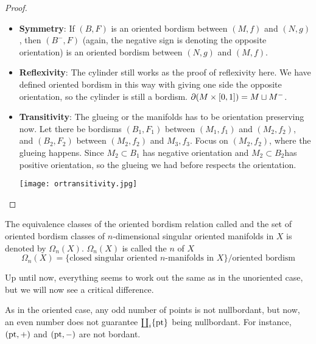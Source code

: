 \documentclass[a4paper,11pt]{article}
\begin{document}
\begin{proof}
    \begin{itemize}
        \item \textbf{Symmetry}: If \((B,F)\) is an oriented bordism between \((M,f)\) and \((N,g)\), then \((B^-,F)\) (again, the negative sign is denoting the opposite orientation) is an oriented bordism between \((N,g)\) and \((M,f)\).
        \item \textbf{Reflexivity}: The cylinder still works as the proof of reflexivity here. We have defined oriented bordism in this way with giving one side the opposite orientation, so the cylinder is still a bordism. \(\partial(M\times [0,1])=M\sqcup M^-\).
        \item \textbf{Transitivity}: The glueing or the manifolds has to be orientation preserving now. Let there be bordisms \((B_1,F_1)\) between \((M_1,f_1)\) and \((M_2,f_2)\), and \((B_2,F_2)\) between \((M_2,f_2)\) and \(M_3,f_3\). Focus on \((M_2,f_2)\), where the glueing happens. Since \(M_2\subset B_1\) has negative orientation and \(M_2\subset B_2\)has positive orientation, so the glueing we had before respects the orientation.
        \begin{center}
        \texttt{[image: ortransitivity.jpg]}
        \end{center}
    \end{itemize}
\end{proof}

\begin{definition}
    The equivalence classes of the oriented bordism relation called  and the set of oriented bordism classes of \(n\)-dimensional singular oriented manifolds in \(X\) is denoted by \(\Omega_n(X)\). \(\Omega_n(X)\) is called the \(n\) of \(X\)
    \[\Omega_n(X)=\{\text{closed singular oriented \(n\)-manifolds in } X\}\big/\text{oriented bordism}\]
\end{definition}

Up until now, everything seems to work out the same as in the unoriented case, but we will now see a critical difference.

\begin{observation}
    As in the oriented case, any odd number of points is not nullbordant, but now, an even number does not guarantee \(\coprod_i\{\mathrm{pt}\}\) being nullbordant. For instance, \((\mathrm{pt},+)\) and \((\mathrm{pt},-)\) are not bordant.
\end{observation}
\end{document}
